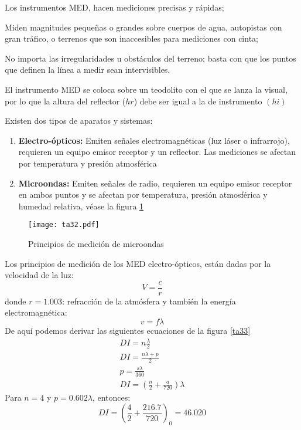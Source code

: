 Los instrumentos MED, hacen mediciones precisas y rápidas;

Miden magnitudes pequeñas o grandes sobre cuerpos de agua, autopistas con gran tráfico, o terrenos que son inaccesibles para mediciones con cinta;

No importa las irregularidades u obstáculos del terreno; basta con que los puntos que definen la línea a medir sean intervisibles.

El instrumento MED se coloca sobre un teodolito con el que se lanza la visual, por lo que la altura del reflector ($hr$) debe ser igual a la de instrumento $(hi)$

Existen dos tipos de aparatos y sistemas:

\begin{enumerate}
    \item \textbf{Electro-ópticos:} Emiten señales electromagnéticas (luz láser o infrarrojo), requieren un equipo emisor receptor y un reflector. Las mediciones se afectan por temperatura y presión atmosférica
    \item \textbf{Microondas:} Emiten señales de radio, requieren un equipo emisor receptor en ambos puntos y se afectan por temperatura, presión atmosférica y humedad relativa, véase la figura \ref{hb32}
\end{enumerate}
\begin{figure}[h!]
\centering
  \texttt{[image: ta32.pdf]}
  \caption{Principios de medición de microondas}
  \label{hb32}
\end{figure}
Los principios de medición de los MED electro-ópticos, están dadas por la velocidad de la luz:
\begin{equation}
    V = \frac{c}{r}
\end{equation}
donde $r=1.003$: refracción de la atmósfera
y también la energía electromagnética:
\begin{equation}
    v = f\lambda
\end{equation}
De aquí podemos derivar las siguientes ecuaciones de la figura \ref{ta33}
\begin{align}
    DI = n\frac{\lambda}{2}\\
    DI =\frac{n\lambda + p}{2}\\
    p =\frac{s\lambda}{360}\\
    DI =\left(\frac{n}{2} + \frac{a}{720}\right)\lambda
\end{align}
Para $n=4$ y $p=0.602\lambda$, entonces:
\begin{equation*}
    DI =\left(\frac{4}{2} + \frac{216.7}{720}\right)_0 = 46.020
\end{equation*}

